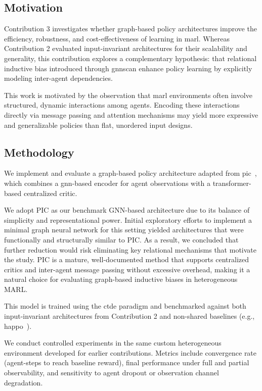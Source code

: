 \subsection{Motivation}

Contribution 3 investigates whether graph-based policy architectures improve 
the efficiency, robustness, and cost-effectiveness of learning in \gls{marl}. 
Whereas Contribution 2 evaluated input-invariant architectures for their 
scalability and generality, this contribution explores a complementary hypothesis: 
that relational inductive bias introduced through \glspl{gnn}can enhance 
policy learning by explicitly modeling inter-agent dependencies.

This work is motivated by the observation that \gls{marl} environments 
often involve structured, dynamic interactions among agents. 
Encoding these interactions directly via message passing and attention 
mechanisms may yield more expressive and generalizable policies than flat, 
unordered input designs.


\subsection{Methodology}

We implement and evaluate a graph-based policy architecture adapted from 
\gls{pic}~\cite{liu2020b}, which combines a \gls{gnn}-based encoder for 
agent observations with a transformer-based centralized critic. 

We adopt PIC as our benchmark GNN-based architecture due to its 
balance of simplicity and representational power. 
Initial exploratory efforts to implement a minimal 
graph neural network for this setting yielded architectures 
that were functionally and structurally similar to PIC. 
As a result, we concluded that further reduction would risk 
eliminating key relational mechanisms that motivate the study. 
PIC is a mature, well-documented method that supports centralized 
critics and inter-agent message passing without excessive overhead, 
making it a natural choice for evaluating graph-based inductive biases in heterogeneous MARL.

This model is trained using the \gls{ctde} paradigm and benchmarked against 
both input-invariant architectures from Contribution 2 and non-shared 
baselines (e.g., \gls{happo}~\cite{zhong2024}).

We conduct controlled experiments in the same custom heterogeneous 
environment developed for earlier contributions. 
Metrics include convergence rate (agent-steps to reach baseline reward), 
final performance under full and partial observability, 
and sensitivity to agent dropout or observation channel degradation.


